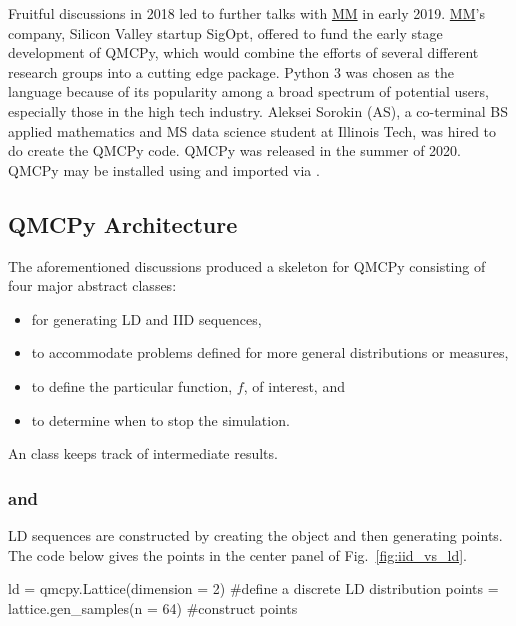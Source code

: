 \documentclass[11pt]{NSFamsart}
\newcommand{\MM}{\hyperlink{MMlink}{MM}\xspace}
\begin{document}
Fruitful discussions in 2018 led to further talks with \MM in early 2019.  \MM's company, Silicon Valley startup SigOpt, offered to fund the early stage development of  QMCPy, which would combine the efforts of several different research groups into a cutting edge package. Python 3 was chosen as the language because of its popularity among a broad spectrum of potential users, especially those in the high tech industry.  \hypertarget{ASlink}{Aleksei Sorokin} (AS),  a co-terminal BS applied mathematics and MS data science student at Illinois Tech, was hired to do create the QMCPy code.  QMCPy was released in the summer of 2020.  QMCPy may be installed using  and imported via .




\subsection{QMCPy Architecture}

The aforementioned discussions produced a skeleton for QMCPy consisting of four major abstract classes:
\begin{itemize}
	\item {} for generating LD and IID sequences,
	\item {} to accommodate problems defined for more general distributions or measures,
	\item {} to define the particular function, $f$, of interest, and
	\item {} to determine when to stop the simulation.
\end{itemize}
An  class keeps track of intermediate results.

\subsubsection{\textup{ and }} LD sequences are constructed by creating the object and then generating points.  The code below gives the points in the center panel of Fig.\ \ref{fig:iid_vs_ld}.
\begin{pythoncode}
ld = qmcpy.Lattice(dimension = 2)  #define a discrete LD distribution 
points = lattice.gen_samples(n = 64)  #construct points
\end{pythoncode}
\end{document}
